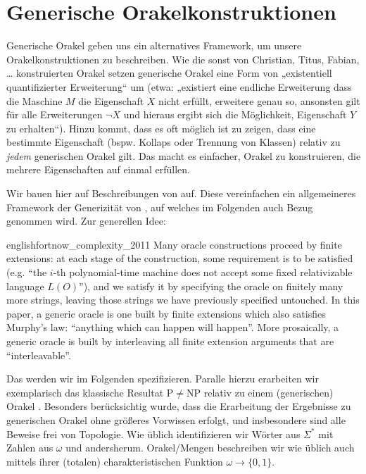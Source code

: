 \documentclass[nofonts]{uebung}
\theoremstyle{definition}
\def\P{\ensuremath{\mathrm{P}}}
\def\NP{\ensuremath{\mathrm{NP}}}
\begin{document}
\clearpage
\section{Generische Orakelkonstruktionen}

Generische Orakel geben uns ein alternatives Framework, um unsere Orakelkonstruktionen zu beschreiben. Wie die sonst von Christian, Titus, Fabian, \dots{} konstruierten Orakel setzen generische Orakel eine Form von „existentiell quantifizierter Erweiterung“ um (etwa: „existiert eine endliche Erweiterung dass die Maschine $M$ die Eigenschaft $X$ nicht erfüllt, erweitere genau so, ansonsten gilt für alle Erweiterungen $\neg X$ und hieraus ergibt sich die Möglichkeit, Eigenschaft $Y$ zu erhalten“).
Hinzu kommt, dass es oft möglich ist zu zeigen, dass eine bestimmte Eigenschaft (bspw. Kollaps oder Trennung von Klassen) relativ zu \emph{jedem} generischen Orakel gilt. Das macht es einfacher, Orakel zu konstruieren, die mehrere Eigenschaften auf einmal erfüllen.

Wir bauen hier auf Beschreibungen von \textcite{fortnow_complexity_2011} auf. Diese vereinfachen ein allgemeineres Framework der Generizität von \textcite{fenner_oracle_2003}, auf welches im Folgenden auch Bezug genommen wird.
Zur generellen Idee:

\begin{foreigndisplaycquote}{english}{fortnow_complexity_2011}
Many oracle constructions proceed by finite extensions: at each stage of the construction, some requirement is to be satisfied (e.g. “the $i$-th polynomial-time machine does not accept some fixed relativizable language $L(O)$”), and we satisfy it by specifying the oracle on finitely many more strings, leaving those strings we have previously specified untouched. In this paper, a generic oracle is one built by finite extensions which also satisfies Murphy’s law: “anything which can happen will happen”. More prosaically, a generic oracle is built by interleaving all finite extension arguments that are “interleavable”.
\end{foreigndisplaycquote}

Das werden wir im Folgenden spezifizieren. Paralle hierzu erarbeiten wir exemplarisch das klassische Resultat $\P\neq\NP$ relativ zu einem (generischen) Orakel \parencite{baker_relativizations_1975}.
Besonders berücksichtig wurde, dass die Erarbeitung der Ergebnisse zu generischen Orakel ohne größeres Vorwissen erfolgt, und insbesondere sind alle Beweise frei von Topologie.
Wie üblich identifizieren wir Wörter aus $\Sigma^*$ mit Zahlen aus $\omega$ und andersherum.
Orakel/Mengen beschreiben wir wie üblich auch mittels ihrer (totalen) charakteristischen Funktion $\omega\to\{0,1\}$.
\end{document}
